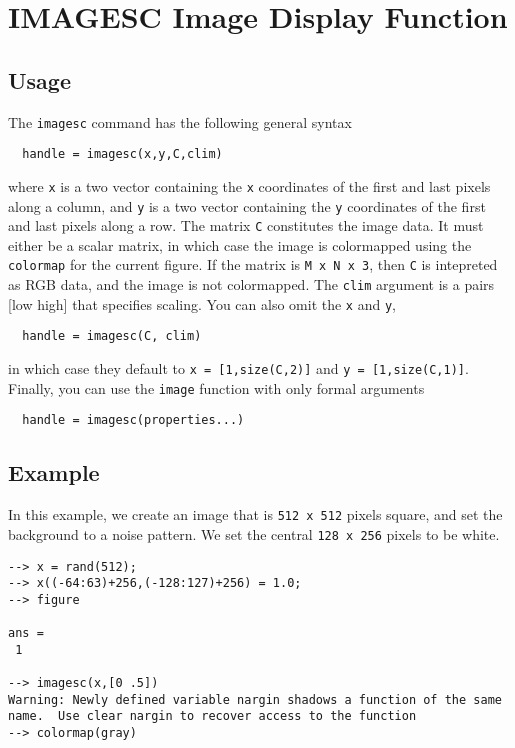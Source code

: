 \section{IMAGESC Image Display Function}

\subsection{Usage}

The \verb|imagesc| command has the following general syntax
\begin{verbatim}
  handle = imagesc(x,y,C,clim)
\end{verbatim}
where \verb|x| is a two vector containing the \verb|x| coordinates
of the first and last pixels along a column, and \verb|y| is a
two vector containing the \verb|y| coordinates of the first and
last pixels along a row.  The matrix \verb|C| constitutes the
image data.  It must either be a scalar matrix, in which case
the image is colormapped using the  \verb|colormap| for the current
figure.  If the matrix is \verb|M x N x 3|, then \verb|C| is intepreted
as RGB data, and the image is not colormapped.  The \verb|clim|
argument is a pairs [low high] that specifies scaling.  You can 
also omit the \verb|x| and \verb|y|, 
\begin{verbatim}
  handle = imagesc(C, clim)
\end{verbatim}
in which case they default to \verb|x = [1,size(C,2)]| and 
\verb|y = [1,size(C,1)]|.  Finally, you can use the \verb|image| function
with only formal arguments
\begin{verbatim}
  handle = imagesc(properties...)
\end{verbatim}

\subsection{Example}

In this example, we create an image that is \verb|512 x 512| pixels
square, and set the background to a noise pattern.  We set the central
\verb|128 x 256| pixels to be white.
\begin{verbatim}
--> x = rand(512);
--> x((-64:63)+256,(-128:127)+256) = 1.0;
--> figure

ans = 
 1 

--> imagesc(x,[0 .5])
Warning: Newly defined variable nargin shadows a function of the same name.  Use clear nargin to recover access to the function
--> colormap(gray)
\end{verbatim}

